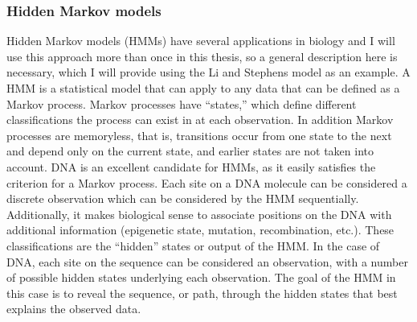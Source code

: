 \subsubsection{Hidden Markov models}
Hidden Markov models (HMMs) have several applications in biology and I will use this approach more than once in this thesis, so a general description here is necessary, which I will provide using the Li and Stephens model as an example.
A HMM is a statistical model that can apply to any data that can be defined as a Markov process.
Markov processes have ``states,'' which define different classifications the process can exist in at each observation.
In addition Markov processes are memoryless, that is, transitions occur from one state to the next and depend only on the current state, and earlier states are not taken into account.
DNA is an excellent candidate for HMMs, as it easily satisfies the criterion for a Markov process.
Each site on a DNA molecule can be considered a discrete observation which can be considered by the HMM sequentially.
Additionally, it makes biological sense to associate positions on the DNA with additional information (epigenetic state, mutation, recombination, etc.).
These classifications are the ``hidden'' states or output of the HMM.
In the case of DNA, each site on the sequence can be considered an observation, with a number of possible hidden states underlying each observation.
The goal of the HMM in this case is to reveal the sequence, or path, through the hidden states that best explains the observed data.







